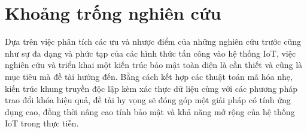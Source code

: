\section{Khoảng trống nghiên cứu}
Dựa trên việc phân tích các ưu và nhược điểm của những nghiên cứu trước cũng như sự đa dạng và phức tạp của các hình thức tấn công vào hệ thống IoT, việc nghiên cứu và triển khai một kiến trúc bảo mật toàn diện là cần thiết và cũng là mục tiêu mà đề tài hướng đến. Bằng cách kết hợp các thuật toán mã hóa nhẹ, kiến trúc khung truyền độc lập kèm xác thực dữ liệu cùng với các phương pháp trao đổi khóa hiệu quả, đề tài hy vọng sẽ đóng góp một giải pháp có tính ứng dụng cao, đồng thời nâng cao tính bảo mật và khả năng mở rộng của hệ thống IoT trong thực tiễn.




